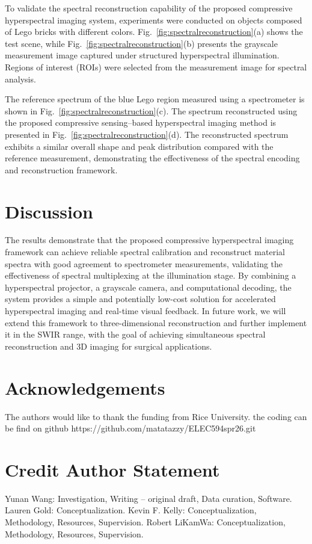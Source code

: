 \documentclass[conference]{IEEEtran}
\begin{document}
To validate the spectral reconstruction capability of the proposed compressive hyperspectral imaging system, experiments were conducted on objects composed of Lego bricks with different colors. Fig.~\ref{fig:spectralreconstruction}(a) shows the test scene, while Fig.~\ref{fig:spectralreconstruction}(b) presents the grayscale measurement image captured under structured hyperspectral illumination. Regions of interest (ROIs) were selected from the measurement image for spectral analysis.

The reference spectrum of the blue Lego region measured using a spectrometer is shown in Fig.~\ref{fig:spectralreconstruction}(c). The spectrum reconstructed using the proposed compressive sensing–based hyperspectral imaging method is presented in Fig.~\ref{fig:spectralreconstruction}(d). The reconstructed spectrum exhibits a similar overall shape and peak distribution compared with the reference measurement, demonstrating the effectiveness of the spectral encoding and reconstruction framework.


\section{Discussion}

The results demonstrate that the proposed compressive hyperspectral imaging framework can achieve reliable spectral calibration and reconstruct material spectra with good agreement to spectrometer measurements, validating the effectiveness of spectral multiplexing at the illumination stage. By combining a hyperspectral projector, a grayscale camera, and computational decoding, the system provides a simple and potentially low-cost solution for accelerated hyperspectral imaging and real-time visual feedback. In future work, we will extend this framework to three-dimensional reconstruction and further implement it in the SWIR range, with the goal of achieving simultaneous spectral reconstruction and 3D imaging for surgical applications.

\section{Acknowledgements}

The authors would like to thank the funding from Rice University.
the coding can be find on github https://github.com/matatazzy/ELEC594spr26.git

\section{Credit Author Statement}
Yunan Wang: Investigation, Writing – original draft, Data curation, Software.
Lauren Gold: Conceptualization.
Kevin F. Kelly: Conceptualization, Methodology, Resources, Supervision.
Robert LiKamWa: Conceptualization, Methodology, Resources, Supervision.
\end{document}
